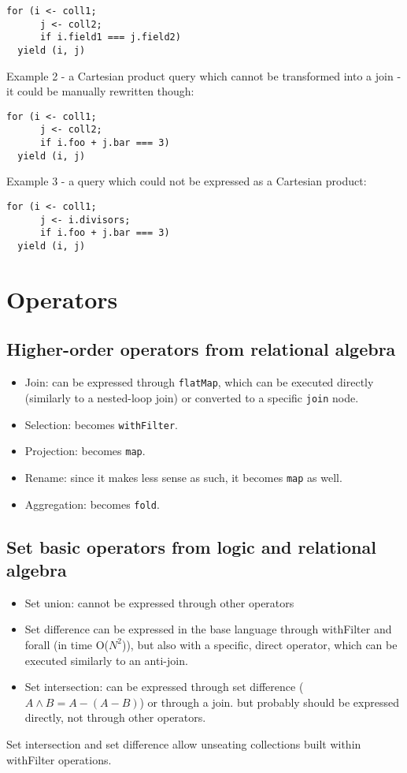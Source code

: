 \documentclass[preprint,authoryear,10pt]{sigplanconf}
\newcommand{\intersect}{\wedge}
\begin{document}
\begin{verbatim}
for (i <- coll1;
      j <- coll2;
      if i.field1 === j.field2)
  yield (i, j)
\end{verbatim}
Example 2 - a Cartesian product query which cannot be transformed into a
join - it could be manually rewritten though:

\begin{verbatim}
for (i <- coll1;
      j <- coll2;
      if i.foo + j.bar === 3)
  yield (i, j)
\end{verbatim}
Example 3 - a query which could not be expressed as a Cartesian product:

\begin{verbatim}
for (i <- coll1;
      j <- i.divisors;
      if i.foo + j.bar === 3)
  yield (i, j)
\end{verbatim}
\section{Operators}

\subsection{Higher-order operators from relational algebra}

\begin{itemize}
\item
  Join: can be expressed through \texttt{flatMap}, which can be executed
  directly (similarly to a nested-loop join) or converted to a specific
  \texttt{join} node.
\item
  Selection: becomes \texttt{withFilter}.
\item
  Projection: becomes \texttt{map}.
\item
  Rename: since it makes less sense as such, it becomes \texttt{map} as
  well.
\item
  Aggregation: becomes \texttt{fold}.
\end{itemize}
\subsection{Set basic operators from logic and relational algebra}

\begin{itemize}
\item
  Set union: cannot be expressed through other operators
\item
  Set difference can be expressed in the base language through
  withFilter and forall (in time O($N^2$)), but also with a specific,
  direct operator, which can be executed similarly to an anti-join.
\item
  Set intersection: can be expressed through set difference
  ($A \intersect B = A - (A - B)$) or through a join. but probably
  should be expressed directly, not through other operators.
\end{itemize}
Set intersection and set difference allow unseating collections built
within withFilter operations.
\end{document}
